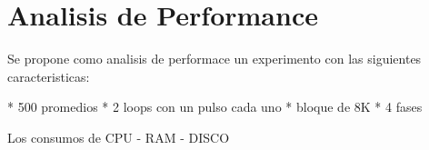 \section{Analisis de Performance}


Se propone como analisis de performace un experimento con las siguientes caracteristicas:

* 500 promedios
* 2 loops con un pulso cada uno
* bloque de 8K
* 4 fases

Los consumos de CPU - RAM - DISCO